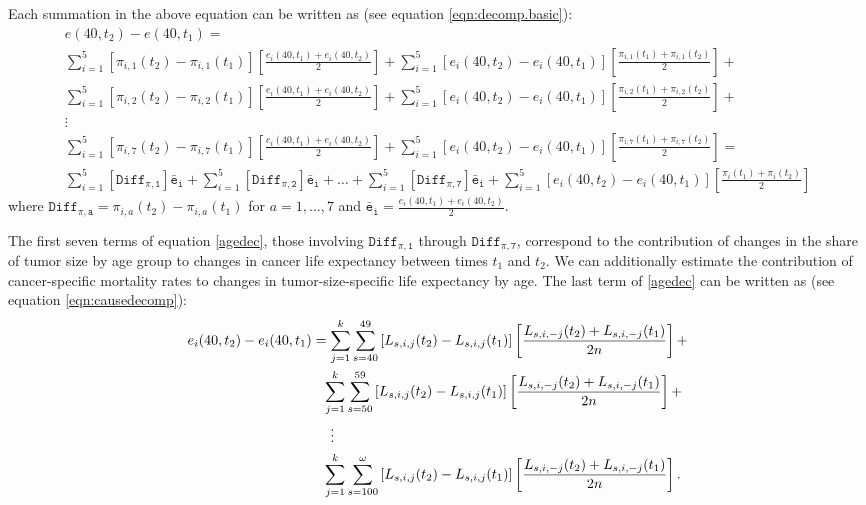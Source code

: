 \documentclass[11pt,letterpaper]{article}
\theoremstyle{plain}
\theoremstyle{remark}
\numberwithin{equation}{section}
\begin{document}
Each summation in the above equation can be written as (see equation
 \eqref{eqn:decomp.basic}):
\begin{multline}
  e(40,t_2)-e(40,t_1)= \\
  \sum_{i=1}^{5}\left[\pi_{i,1}(t_2)-\pi_{i,1}(t_1) \right]\left[\frac{e_i(40,t_1)+e_i(40,t_2)}{2}\right]+\sum_{i=1}^{5}\left[e_i(40,t_2)-e_i(40,t_1) \right]\left[\frac{\pi_{i,1}(t_1)+\pi_{i,1}(t_2)}{2}\right] +\\
  \sum_{i=1}^{5}\left[\pi_{i,2}(t_2)-\pi_{i,2}(t_1) \right]\left[\frac{e_i(40,t_1)+e_i(40,t_2)}{2}\right]+\sum_{i=1}^{5}\left[e_i(40,t_2)-e_i(40,t_1) \right]\left[\frac{\pi_{i,2}(t_1)+\pi_{i,2}(t_2)}{2}\right] +\\
  \vdots \\
  \sum_{i=1}^{5}\left[\pi_{i,7}(t_2)-\pi_{i,7}(t_1) \right]\left[\frac{e_i(40,t_1)+e_i(40,t_2)}{2}\right]+\sum_{i=1}^{5}\left[e_i(40,t_2)-e_i(40,t_1) \right]\left[\frac{\pi_{i,7}(t_1)+\pi_{i,7}(t_2)}{2}\right] =\\
  \sum_{i=1}^{5}\left[\mathtt{Diff_{\pi,1}} \right]\mathtt{\bar{e}_i} + \sum_{i=1}^{5}\left[\mathtt{Diff_{\pi,2}} \right]\mathtt{\bar{e}_i} + 
  \dots +
 \sum_{i=1}^{5}\left[\mathtt{Diff_{\pi,7}} \right]\mathtt{\bar{e}_i} +\sum_{i=1}^{5}\left[e_i(40,t_2)-e_i(40,t_1)\right]\left[\frac{\pi_i(t_1)+\pi_i(t_2)}{2}\right]
\label{agedec}
\end{multline}
where $\mathtt{Diff_{\pi,a}}=\pi_{i,a}(t_2)-\pi_{i,a}(t_1)$ for $a=1,\dots,7$ and $\mathtt{\bar{e}_i}=\frac{e_i(40,t_1)+e_i(40,t_2)}{2}$.

The first seven terms of equation \eqref{agedec}, those involving $\mathtt{Diff_{\pi,1}}$ through $\mathtt{Diff_{\pi,7}}$,  correspond to the
contribution of changes in the share of tumor size by age group to
changes in cancer life expectancy between times $t_1$ and $t_2$. We
can additionally estimate the contribution of cancer-specific
mortality rates to changes in tumor-size-specific life expectancy by
age. The last term of \eqref{agedec} can be written as (see equation
\eqref{eqn:causedecomp}):
\begin{align}
  e_i(40,t_2)-e_i(40,t_1)&=\sum_{j=1}^{k} \sum_{s=40}^{49}\left[L_{s,i,j}(t_2)-L_{s,i,j}(t_1) \right] \left[\frac{L_{s,i,-j}(t_2)+L_{s,i,-j}(t_1) }{2n} \right] + \notag\\
  &\phantom{=}\sum_{j=1}^{k} \sum_{s=50}^{59}\left[L_{s,i,j}(t_2)-L_{s,i,j}(t_1) \right] \left[\frac{L_{s,i,-j}(t_2)+L_{s,i,-j}(t_1) }{2n} \right] + \notag\\
  &\phantom{=  .}\vdots \notag\\
  &\phantom{=}\sum_{j=1}^{k} \sum_{s=100}^{\omega}\left[L_{s,i,j}(t_2)-L_{s,i,j}(t_1) \right] \left[\frac{L_{s,i,-j}(t_2)+L_{s,i,-j}(t_1) }{2n} \right] .
\end{align}
\end{document}
